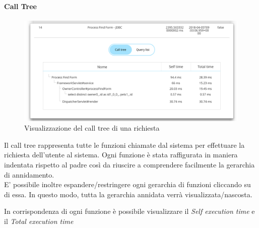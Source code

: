 \paragraph {Call Tree} \Spazio
\begin{figure}[H]
	\centering 
	\includegraphics[width=1\textwidth]{Images/calltree}
	\caption{Visualizzazione del call tree di una richiesta}
\end{figure}
Il call tree rappresenta tutte le funzioni chiamate dal sistema per effettuare la richiesta dell'utente al sistema.
Ogni funzione è stata raffigurata in maniera indentata rispetto al padre così da riuscire a comprendere facilmente la gerarchia di annidamento.\\
E' possibile inoltre espandere/restringere ogni gerarchia di funzioni cliccando su di essa. In questo modo, tutta la gerarchia annidata verrà visualizzata/nascosta.

In corrispondenza di ogni funzione è possibile visualizzare il \emph{Self execution time} e il \emph{Total execution time}
\\


